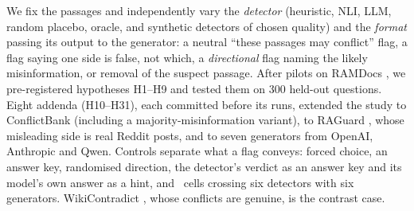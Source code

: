 We fix the passages and independently vary the \emph{detector} (heuristic, NLI, LLM, random placebo,
oracle, and synthetic detectors of chosen quality) and the \emph{format} passing its output to the generator: a
neutral ``these passages may conflict'' flag, a flag saying one side is false, not which, a
\emph{directional} flag naming the likely misinformation, or removal of the suspect passage. After pilots on
RAMDocs \citep{wang2025madam}, we pre-registered hypotheses H1--H9 and tested them on 300 held-out questions.
Eight addenda (H10--H31), each committed before its runs, extended the study to ConflictBank \citep{su2024conflictbank}
(including a majority-misinformation variant), to RAGuard \citep{zeng2025raguard}, whose
misleading side is real Reddit posts, and to seven generators from OpenAI, Anthropic and Qwen. Controls separate what a
flag conveys: forced choice, an answer key, randomised direction, the detector's verdict as an answer key and its model's own answer as
a hint, and \hTwentyFourCells\ cells crossing six detectors with six generators. WikiContradict \citep{hou2024wikicontradict}, whose conflicts are genuine, is the contrast case.

